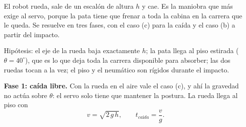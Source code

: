 \documentclass[11pt,a4paper]{article}
\begin{document}
El robot rueda, sale de un escalón de altura \(h\) y cae. Es la maniobra que más exige al servo, porque la
pata tiene que frenar a toda la cabina en la carrera que le queda. Se resuelve en tres fases, con el caso
(c) para la caída y el caso (b) a partir del impacto.

Hipótesis: el eje de la rueda baja exactamente \(h\); la pata llega al piso estirada (\(\theta=40^\circ\)),
que es lo que deja toda la carrera disponible para absorber; las dos ruedas tocan a la vez; el piso y el
neumático son rígidos durante el impacto.

\textbf{Fase 1: caída libre.} Con la rueda en el aire vale el caso (c), y ahí la gravedad no actúa sobre
\(\theta\): el servo solo tiene que mantener la postura. La rueda llega al piso con
\begin{equation}
v=\sqrt{2\,g\,h},\qquad t_{ca\text{í}da}=\frac{v}{g}.
\label{eq:caida}
\end{equation}
\end{document}

